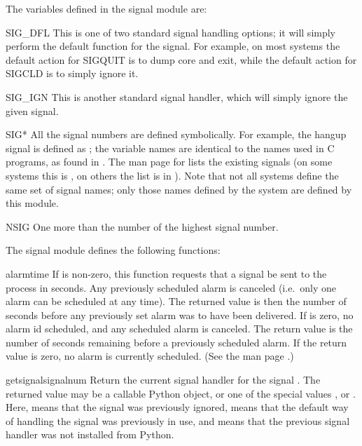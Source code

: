 The variables defined in the signal module are:

\renewcommand{\indexsubitem}{(in module signal)}
\begin{datadesc}{SIG_DFL}
  This is one of two standard signal handling options; it will simply
  perform the default function for the signal.  For example, on most
  systems the default action for SIGQUIT is to dump core and exit,
  while the default action for SIGCLD is to simply ignore it.
\end{datadesc}

\begin{datadesc}{SIG_IGN}
  This is another standard signal handler, which will simply ignore
  the given signal.
\end{datadesc}

\begin{datadesc}{SIG*}
  All the signal numbers are defined symbolically.  For example, the
  hangup signal is defined as ; the variable names
  are identical to the names used in C programs, as found in
  .
  The \UNIX{} man page for  lists the existing signals (on
  some systems this is , on others the list is in
  ).
  Note that not all systems define the same set of signal names; only
  those names defined by the system are defined by this module.
\end{datadesc}

\begin{datadesc}{NSIG}
  One more than the number of the highest signal number.
\end{datadesc}

The signal module defines the following functions:

\begin{funcdesc}{alarm}{time}
  If  is non-zero, this function requests that a
   signal be sent to the process in  seconds.
  Any previously scheduled alarm is canceled (i.e.\ only one alarm can
  be scheduled at any time).  The returned value is then the number of
  seconds before any previously set alarm was to have been delivered.
  If  is zero, no alarm id scheduled, and any scheduled
  alarm is canceled.  The return value is the number of seconds
  remaining before a previously scheduled alarm.  If the return value
  is zero, no alarm is currently scheduled.  (See the \UNIX{} man page
  .)
\end{funcdesc}

\begin{funcdesc}{getsignal}{signalnum}
  Return the current signal handler for the signal .
  The returned value may be a callable Python object, or one of the
  special values ,  or
  .  Here,  means that the signal was
  previously ignored,  means that the default way
  of handling the signal was previously in use, and  means
  that the previous signal handler was not installed from Python.
\end{funcdesc}

